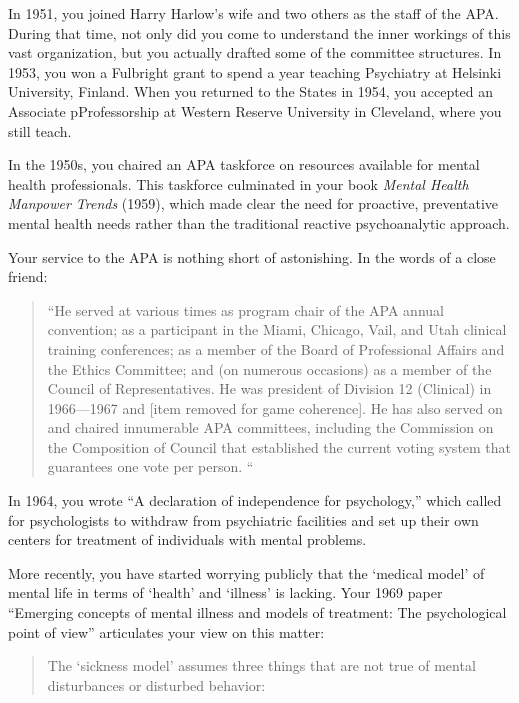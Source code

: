 \begin{refsection}
In 1951, you joined Harry Harlow's wife and two others as the staff of the APA. During that time, not only did you come to understand the inner workings of this vast organization, but you actually drafted some of the committee structures. In 1953, you won a Fulbright grant to spend a year teaching Psychiatry at Helsinki University, Finland. When you returned to the States in 1954, you accepted an Associate pProfessorship at Western Reserve University in Cleveland, where you still teach.

In the 1950s, you chaired an APA taskforce on resources available for mental health professionals. This taskforce culminated in your book \emph{Mental Health Manpower Trends} (1959), which made clear the need for proactive, preventative mental health needs rather than the traditional reactive psychoanalytic approach.

Your service to the APA is nothing short of astonishing. In the words of a close friend:

\begin{quote}

“He served at various times as program chair of the APA annual convention; as a participant in the Miami, Chicago, Vail, and Utah clinical training conferences; as a member of the Board of Professional Affairs and the Ethics Committee; and (on numerous occasions) as a member of the Council of Representatives. He was president of Division 12 (Clinical) in 1966—1967 and [item removed for game coherence]. He has also served on and chaired innumerable APA committees, including the Commission on the Composition of Council that established the current voting system that guarantees one vote per person. “
\end{quote}

In 1964, you wrote “A declaration of independence for psychology,” which called for psychologists to withdraw from psychiatric facilities and set up their own centers for treatment of individuals with mental problems. 

More recently, you have started worrying publicly that the ‘medical model’ of mental life in terms of ‘health’ and ‘illness’ is lacking. Your 1969 paper “Emerging concepts of mental illness and models of treatment: The psychological point of view” articulates your view on this matter:

\begin{quote}

The ‘sickness model’ assumes three things that are not true of mental disturbances or disturbed behavior: 
\end{quote}


\end{refsection}
